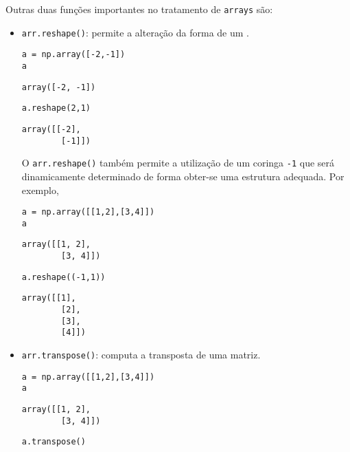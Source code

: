 Outras duas funções importantes no tratamento de \texttt{arrays} são:
\begin{itemize}
\item \texttt{arr.reshape()}: permite a alteração da forma de um {\PYTHONnumpyDOTarray}.
  
\begin{lstlisting}
a = np.array([-2,-1])
a
\end{lstlisting}

\begin{verbatim}
array([-2, -1])
\end{verbatim}

\begin{lstlisting}
a.reshape(2,1)
\end{lstlisting}

\begin{verbatim}
array([[-2],
        [-1]])
\end{verbatim}

O \texttt{arr.reshape()} também permite a utilização de um coringa \texttt{-1} que será dinamicamente determinado de forma obter-se uma estrutura adequada. Por exemplo,

\begin{lstlisting}
a = np.array([[1,2],[3,4]])
a
\end{lstlisting}

\begin{verbatim}
array([[1, 2],
        [3, 4]])
\end{verbatim}

\begin{lstlisting}
a.reshape((-1,1))
\end{lstlisting}

\begin{verbatim}
array([[1],
        [2],
        [3],
        [4]])
\end{verbatim}

\item \texttt{arr.transpose()}: computa a transposta de uma matriz.

\begin{lstlisting}
a = np.array([[1,2],[3,4]])
a
\end{lstlisting}

\begin{verbatim}
array([[1, 2],
        [3, 4]])
\end{verbatim}

\begin{lstlisting}
a.transpose()
\end{lstlisting}


\end{itemize}
